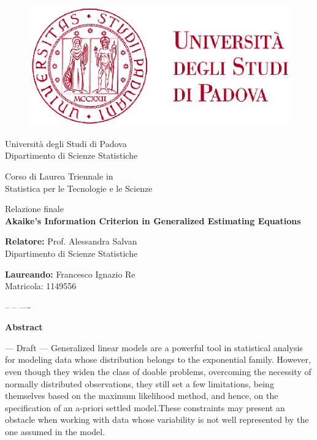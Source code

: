 \documentclass[a4paper, 12pt, twosided]{Thesis}  %
\renewcommand{\maketitle}{
\begin{titlepage}%

 \thispagestyle{empty}
    \enlargethispage{18cm}  %
 
    \noindent
\begin{figure}
      \centering
			\includegraphics{Figures/logo}
\end{figure}
\begin{center}
\huge Universit\`a degli Studi di Padova \\
\LARGE Dipartimento di Scienze Statistiche\\
\vspace{1cm}

\large Corso di Laurea Triennale in\\
\large Statistica per le Tecnologie e le Scienze
\end{center}

\vspace{1cm}
\begin{center}
\large Relazione finale \\
\large
{\textbf{Akaike's Information Criterion in Generalized Estimating Equations}}
\end{center}

\begin{flushleft}
\vspace{1.5cm}
\textbf{Relatore:} Prof. Alessandra Salvan\\
\vspace{0.2cm}
Dipartimento di Scienze Statistiche\\
\end{flushleft}


\begin{flushright}
	\vspace{2cm}
	\textbf{Laureando:} Francesco Ignazio Re\\
	Matricola: 1149556
\end{flushright}
\begin{flushleft}
	\vspace{1cm}
	-- -- ----
\end{flushleft}
\end{titlepage}
}
\begin{document}
\maketitle

\frontmatter	  %

\setcounter{page}{1}

\setlength{\parindent}{3ex}
\fancyhead{}  %
\rhead{\thepage}  %
\lhead{}  %


\pagestyle{empty}  %
\cleardoublepage





\pagestyle{empty}  %




  \null\vspace{4cm}
  \begin{center}
    \setlength{\parskip}{0pt}
    {\huge{{\textbf{Abstract}}} \par}
        \bigskip
        \end{center}
        

        --- Draft ---
Generalized linear models are a powerful tool in statistical analysis for modeling data whose distribution belongs to the exponential family. However, even though they widen the class of doable problems, overcoming the necessity of normally distributed observations, they still set a few limitations, being themselves based on the maximum likelihood method, and hence, on the specification of an a-priori settled model.These constraints may present an obstacle when working with data whose variability is not well represented by the one assumed in the model.
\end{document}

